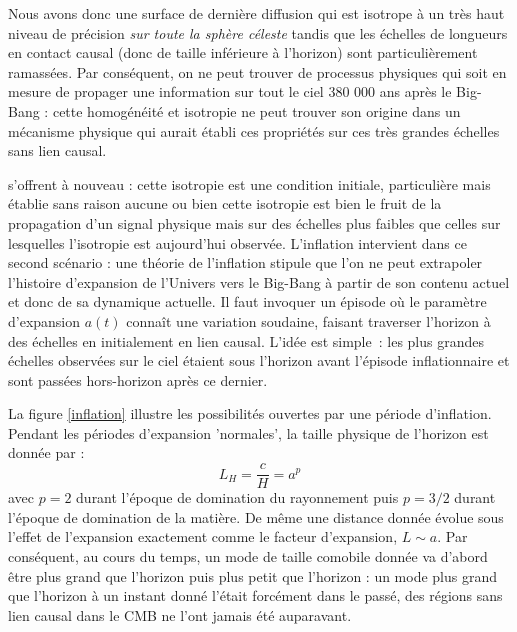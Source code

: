 Nous avons donc une surface de dernière diffusion qui est isotrope à un très haut niveau de précision \textit{sur toute la sphère céleste} tandis que les échelles de longueurs en contact causal (donc de taille inférieure à l'horizon) sont particulièrement ramassées. Par conséquent, on ne peut trouver de processus physiques qui soit en mesure de propager une information sur tout le ciel 380 000 ans après le Big-Bang : cette homogénéité et isotropie ne peut trouver son origine dans un mécanisme physique qui aurait établi ces propriétés sur ces très grandes échelles sans lien causal.

 s'offrent à nouveau : cette isotropie est une condition initiale, particulière mais établie sans raison aucune ou bien cette isotropie est bien le fruit de la propagation d'un signal physique mais sur des échelles plus faibles que celles sur lesquelles l'isotropie est aujourd'hui observée. L'inflation intervient dans ce second scénario : une théorie de l'inflation stipule que l'on ne peut extrapoler l'histoire d'expansion de l'Univers vers le Big-Bang à partir de son contenu actuel et donc de sa dynamique actuelle. Il faut invoquer un épisode où le paramètre d'expansion $a(t)$ connaît une variation soudaine, faisant traverser l'horizon à des échelles en initialement en lien causal. L'idée est simple~: les plus grandes échelles observées sur le ciel étaient sous l'horizon avant l'épisode inflationnaire et sont passées hors-horizon après ce dernier. 

La figure \ref{inflation} illustre les possibilités ouvertes par une période d'inflation. Pendant les périodes d'expansion 'normales', la taille physique de l'horizon est donnée par :
\begin{equation}
L_H=\frac{c}{H}=a^p
\end{equation}
avec $p=2$ durant l'époque de domination du rayonnement puis $p=3/2$ durant l'époque de domination de la matière. De même une distance donnée évolue sous l'effet de l'expansion exactement comme le facteur d'expansion, $L\sim a$. Par conséquent, au cours du temps, un mode de taille comobile donnée va d'abord être plus grand que l'horizon puis plus petit que l'horizon : un mode plus grand que l'horizon à un instant donné l'était forcément dans le passé, des régions sans lien causal dans le CMB ne l'ont jamais été auparavant. 

